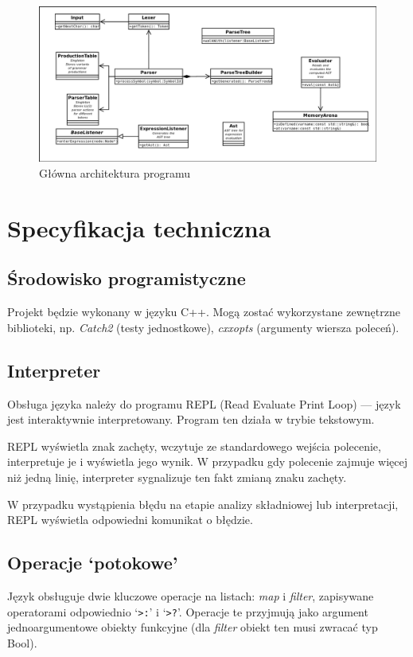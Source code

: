 \documentclass{article}
\begin{document}
\begin{figure}
	\centering
		\includegraphics[scale=0.4]{diagrams/architecture.png}
	\caption{Główna architektura programu}
\end{figure}

\break
\section{Specyfikacja techniczna}

\subsection{Środowisko programistyczne}
	Projekt będzie wykonany w języku C++. Mogą zostać wykorzystane zewnętrzne biblioteki, np. \textit{Catch2} (testy jednostkowe), \textit{cxxopts} (argumenty wiersza poleceń).

\subsection{Interpreter}
	Obsługa języka należy do programu REPL (Read Evaluate Print Loop) --- język jest interaktywnie interpretowany. Program ten działa w trybie tekstowym.

	REPL wyświetla znak zachęty, wczytuje ze standardowego wejścia polecenie, interpretuje je i wyświetla jego wynik. W przypadku gdy polecenie zajmuje więcej niż jedną linię, interpreter sygnalizuje ten fakt zmianą znaku zachęty.

	W przypadku wystąpienia błędu na etapie analizy składniowej lub interpretacji, REPL wyświetla odpowiedni komunikat o błędzie.
\subsection{Operacje `potokowe'}

	Język obsługuje dwie kluczowe operacje na listach: \textit{map} i \textit{filter}, zapisywane operatorami odpowiednio `\verb|>:|' i `\verb|>?|'.
	Operacje te przyjmują jako argument jednoargumentowe obiekty funkcyjne (dla \textit{filter} obiekt ten musi zwracać typ Bool).
\end{document}
